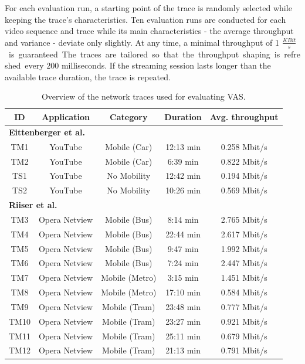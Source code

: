 For each evaluation run, a starting point of the trace is randomly selected while keeping the trace's characteristics. 
Ten evaluation runs are conducted for each video sequence and trace while its main characteristics - the average throughput and variance - deviate only slightly. 
At any time, a minimal throughput of 1 \unit{$\frac{KBit}{s}$} is guaranteed.
The traces are tailored so that the throughput shaping is refreshed every $200$ milliseconds.
If the streaming session lasts longer than the available trace duration, the trace is repeated. 
\begin{table}[!htb]
	\centering
	\caption{Overview of the network traces used for evaluating \ac{VAS}.}
	\begin{tabular}{c|cccc}
	\toprule[2.0pt]
	\textbf{ID} &  \textbf{Application} & \textbf{Category} & \textbf{Duration} & \textbf{Avg. throughput}  \\ 
	\hline
	\multicolumn{5}{l}{\textbf{Eittenberger et al.~\cite{Eittenberger2013}}}\\
	\hline
	TM1 & YouTube & Mobile (Car) & 12:13 min & 0.258 Mbit/s \\
	TM2 & YouTube & Mobile (Car) & 6:39 min & 0.822 Mbit/s \\
	TS1 & YouTube & No Mobility & 12:42 min &  0.194 Mbit/s \\
	TS2 & YouTube & No Mobility & 10:26 min & 0.569 Mbit/s \\
	\hline
	\multicolumn{5}{l}{\textbf{Riiser et al.~\cite{Riiser2013}}}\\
	\hline
	TM3 & Opera Netview & Mobile (Bus) & 8:14 min & 2.765 Mbit/s \\
	TM4 & Opera Netview & Mobile (Bus) & 22:44 min & 2.617 Mbit/s \\
	TM5 & Opera Netview & Mobile (Bus) & 9:47 min & 1.992 Mbit/s \\
	TM6 & Opera Netview & Mobile (Bus) & 7:24 min & 2.447 Mbit/s \\
	TM7 & Opera Netview & Mobile (Metro) & 3:15 min & 1.451 Mbit/s \\
	TM8 & Opera Netview & Mobile (Metro) & 17:10 min & 0.584 Mbit/s \\
	TM9 & Opera Netview & Mobile (Tram) & 23:48 min & 0.777 Mbit/s \\
	TM10 & Opera Netview & Mobile (Tram)& 23:27 min & 0.921 Mbit/s \\
	TM11 & Opera Netview & Mobile (Tram) & 25:11 min & 0.679 Mbit/s \\
	TM12 & Opera Netview & Mobile (Tram) & 21:13 min & 0.791 Mbit/s \\

\end{tabular}
\end{table}
